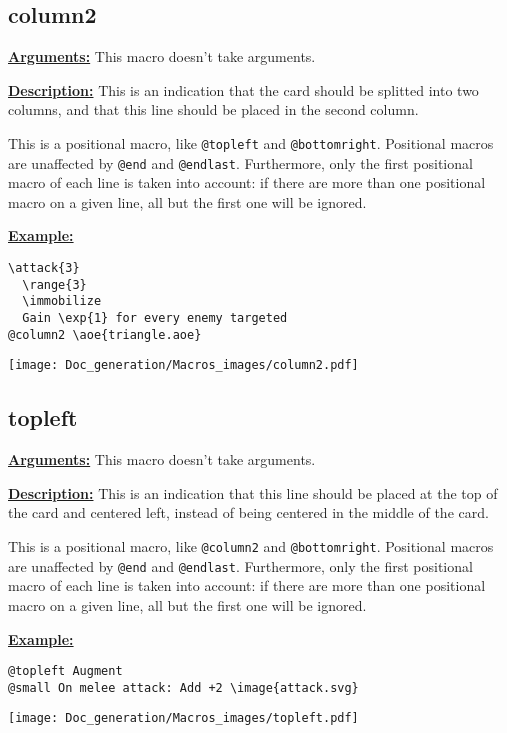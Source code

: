 \documentclass{article}
\begin{document}
\subsection{column2}
\textbf{\underline{Arguments:}} This macro doesn't take arguments.

\textbf{\underline{Description:}} This is an indication that the card should be splitted into two columns, and that this line should be placed in the second column.

This is a positional macro, like \verb`@topleft` and \verb`@bottomright`. Positional macros are unaffected by \verb`@end` and \verb`@endlast`. Furthermore, only the first positional macro of each line is taken into account: if there are more than one positional macro on a given line, all but the first one will be ignored.

\textbf{\underline{Example:}}

\begin{center}
\begin{BVerbatim}
\attack{3}
  \range{3}
  \immobilize
  Gain \exp{1} for every enemy targeted
@column2 \aoe{triangle.aoe}
\end{BVerbatim}

\texttt{[image: Doc\_generation/Macros\_images/column2.pdf]}
\end{center} 

\subsection{topleft}
\textbf{\underline{Arguments:}} This macro doesn't take arguments.

\textbf{\underline{Description:}} This is an indication that this line should be placed at the top of the card and centered left, instead of being centered in the middle of the card.

This is a positional macro, like \verb`@column2` and \verb`@bottomright`. Positional macros are unaffected by \verb`@end` and \verb`@endlast`. Furthermore, only the first positional macro of each line is taken into account: if there are more than one positional macro on a given line, all but the first one will be ignored.

\textbf{\underline{Example:}}

\begin{center}
\begin{BVerbatim}
@topleft Augment
@small On melee attack: Add +2 \image{attack.svg}
\end{BVerbatim}

\texttt{[image: Doc\_generation/Macros\_images/topleft.pdf]}
\end{center}
\end{document}
